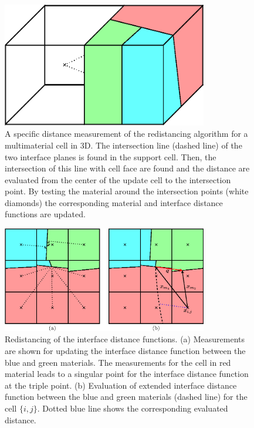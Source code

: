 \documentclass[]{article}
\begin{document}
\begin{figure}[htbp]
  \centering
  \includegraphics[width=0.8\textwidth]{redistancing_3D.eps}
  \caption{A specific distance measurement of the redistancing algorithm for a multimaterial cell in 3D. The intersection line (dashed line) of the two interface planes is found in the support cell. Then, the intersection of this line with cell face are found and the distance are evaluated from the center of the update cell to the intersection point. By testing the material around the intersection points (white diamonds) the corresponding material and interface distance functions are updated.}
  \label{fig:redistancing_3D}
\end{figure}

\begin{figure}[htbp]
  \centering
  \includegraphics[width=0.8\textwidth]{redistancing_ils.eps}
  \caption{Redistancing of the interface distance functions. (a) Measurements are shown for updating the interface distance function between the blue and green materials. The measurements for the cell in red material leads to a singular point for the interface distance function at the triple point. (b) Evaluation of extended interface distance function between the blue and green materials (dashed line) for the cell $\{i,j\}$. Dotted blue line shows the corresponding evaluated distance.}
  \label{fig:redistancing_ils}
\end{figure}
\end{document}
